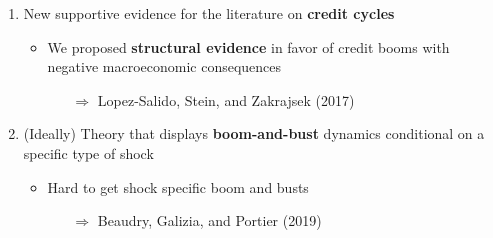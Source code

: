 \documentclass[hyperref={pdfpagelabels=false}]{beamer}
\begin{document}
{\begin{enumerate}
	
	\item New supportive evidence for the literature on \textbf{credit cycles}
	\begin{itemize}
		\item \footnotesize{We proposed \textbf{structural evidence} in favor of credit booms with negative macroeconomic consequences}
		\begin{itemize}
			\item[$\Rightarrow$] Lopez-Salido, Stein, and Zakrajsek (2017) 
		\end{itemize}
		\end{itemize}
	

	
	\bigskip
	
	\item (Ideally) Theory that displays \textbf{boom-and-bust} dynamics conditional on a specific type of shock
	\begin{itemize}
		\item Hard to get shock specific boom and busts
		\begin{itemize}
			\item[$\Rightarrow$] Beaudry, Galizia, and Portier (2019)
		\end{itemize} 
		\end{itemize}
	
	    
\end{enumerate}	
		
}





\end{document}
